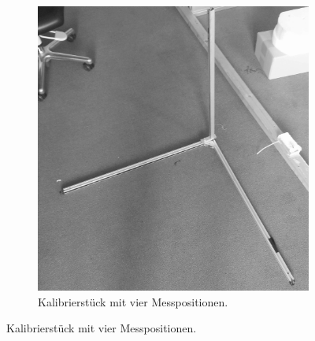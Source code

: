 \begin{figure}[ht!]
\begin{subfigure}[t]{0.4\textwidth}
                 \includegraphics[width=\textwidth]{img/Calibration_Phantom.png}
                 \caption{Kalibrierstück mit vier Messpositionen. }
                 \label{fig:calib_piece}
         \end{subfigure}
         \label{fig:Calibration_Tools}
\end{figure}
 